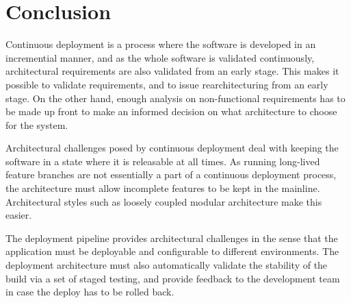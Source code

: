 \documentclass[conference]{IEEEtran}
\begin{document}
\section{Conclusion} %

Continuous deployment is a process where the software is developed in an incremential manner, and as the whole software is validated continuously, architectural requirements are also validated from an early stage. This makes it possible to validate requirements, and to issue rearchitecturing from an early stage. On the other hand, enough analysis on non-functional requirements has to be made up front to make an informed decision on what architecture to choose for the system.

Architectural challenges posed by continuous deployment deal with keeping the software in a state where it is releasable at all times. As running long-lived feature branches are not essentially a part of a continuous deployment process, the architecture must allow incomplete features to be kept in the mainline. Architectural styles such as loosely coupled modular architecture make this easier.

The deployment pipeline provides architectural challenges in the sense that the application must be deployable and configurable to different environments. The deployment architecture must also automatically validate the stability of the build via a set of staged testing, and provide feedback to the development team in case the deploy has to be rolled back.



\end{document}
